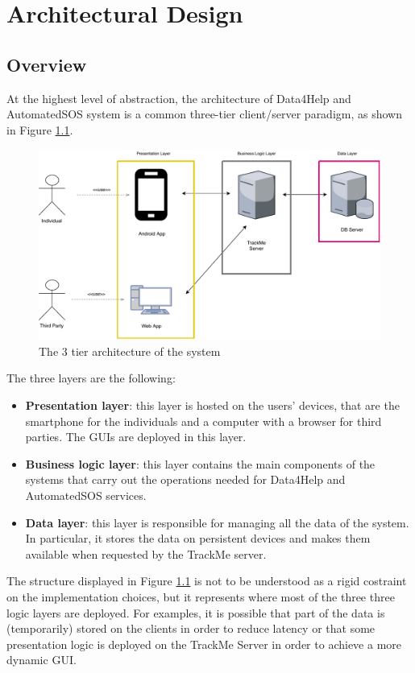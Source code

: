 \chapter{Architectural Design}\label{c:arch}

\section{Overview}

At the highest level of abstraction, the architecture of Data4Help and AutomatedSOS system is a common three-tier client/server paradigm, as shown in Figure \ref{f:3tier}.





\begin{figure}[H]
\centering
\includegraphics[scale=0.65]{resources/overview}
\caption{The 3 tier architecture of the system}\label{f:3tier}
\end{figure}
\noindent
The three layers are the following:

\begin{itemize}
\item \textbf{Presentation layer}: this layer is hosted on the users' devices, that are the smartphone for the individuals and a computer with a browser for third parties.
The GUIs are deployed in this layer.
\item \textbf{Business logic layer}: this layer contains the main components of the systems that carry out the operations needed for Data4Help and AutomatedSOS services.
\item \textbf{Data layer}: this layer is responsible for managing all the data of the system. 
In particular, it stores the data on persistent devices and makes them available when requested by the TrackMe server.
\end{itemize}
The structure displayed in Figure \ref{f:3tier} is not to be understood as a rigid costraint on the implementation choices, but it represents where most of the three three logic layers are deployed.
For examples, it is possible that part of the data is (temporarily) stored on the clients in order to reduce latency or that some presentation logic is deployed on the TrackMe Server in order to achieve a more dynamic GUI.





